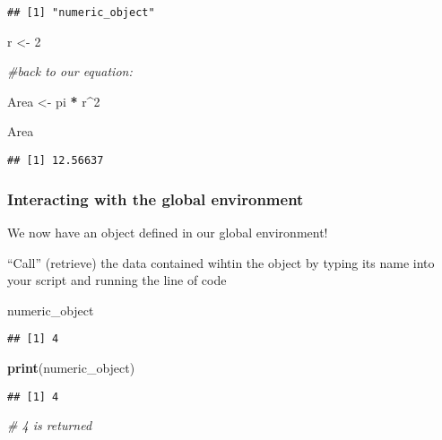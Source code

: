 \documentclass[]{article}
\newenvironment{Shaded}{\begin{snugshade}}{\end{snugshade}}
\newcommand{\KeywordTok}[1]{\textcolor[rgb]{0.13,0.29,0.53}{\textbf{#1}}}
\newcommand{\DecValTok}[1]{\textcolor[rgb]{0.00,0.00,0.81}{#1}}
\newcommand{\StringTok}[1]{\textcolor[rgb]{0.31,0.60,0.02}{#1}}
\newcommand{\CommentTok}[1]{\textcolor[rgb]{0.56,0.35,0.01}{\textit{#1}}}
\newcommand{\OperatorTok}[1]{\textcolor[rgb]{0.81,0.36,0.00}{\textbf{#1}}}
\newcommand{\NormalTok}[1]{#1}
\begin{document}
\begin{verbatim}
## [1] "numeric_object"
\end{verbatim}

\begin{Shaded}
\begin{Highlighting}[]
\NormalTok{r <-}\StringTok{ }\DecValTok{2}

\CommentTok{#back to our equation:}

\NormalTok{Area <-}\StringTok{ }\NormalTok{pi }\OperatorTok{*}\StringTok{ }\NormalTok{r}\OperatorTok{^}\DecValTok{2}

\NormalTok{Area}
\end{Highlighting}
\end{Shaded}

\begin{verbatim}
## [1] 12.56637
\end{verbatim}

\subsubsection{Interacting with the global
environment}\label{interacting-with-the-global-environment}

We now have an object defined in our global environment!

``Call'' (retrieve) the data contained wihtin the object by typing its
name into your script and running the line of code

\begin{Shaded}
\begin{Highlighting}[]
\NormalTok{numeric_object }
\end{Highlighting}
\end{Shaded}

\begin{verbatim}
## [1] 4
\end{verbatim}

\begin{Shaded}
\begin{Highlighting}[]
\KeywordTok{print}\NormalTok{(numeric_object)}
\end{Highlighting}
\end{Shaded}

\begin{verbatim}
## [1] 4
\end{verbatim}

\begin{Shaded}
\begin{Highlighting}[]
\CommentTok{# 4 is returned}
\end{Highlighting}
\end{Shaded}
\end{document}
